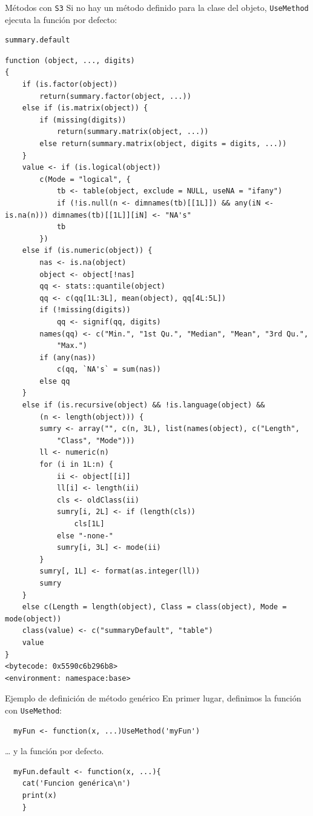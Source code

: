 \documentclass[xcolor={usenames,svgnames,dvipsnames}]{beamer}
\begin{document}
\begin{frame}[label={sec:org9fb195a},fragile]{Métodos con \texttt{S3}}
 Si no hay un método definido para la clase del objeto, \texttt{UseMethod} ejecuta la función por defecto:
\lstset{language=r,label= ,caption= ,captionpos=b,numbers=none}
\begin{lstlisting}
summary.default
\end{lstlisting}

\begin{verbatim}
function (object, ..., digits) 
{
    if (is.factor(object)) 
        return(summary.factor(object, ...))
    else if (is.matrix(object)) {
        if (missing(digits)) 
            return(summary.matrix(object, ...))
        else return(summary.matrix(object, digits = digits, ...))
    }
    value <- if (is.logical(object)) 
        c(Mode = "logical", {
            tb <- table(object, exclude = NULL, useNA = "ifany")
            if (!is.null(n <- dimnames(tb)[[1L]]) && any(iN <- is.na(n))) dimnames(tb)[[1L]][iN] <- "NA's"
            tb
        })
    else if (is.numeric(object)) {
        nas <- is.na(object)
        object <- object[!nas]
        qq <- stats::quantile(object)
        qq <- c(qq[1L:3L], mean(object), qq[4L:5L])
        if (!missing(digits)) 
            qq <- signif(qq, digits)
        names(qq) <- c("Min.", "1st Qu.", "Median", "Mean", "3rd Qu.", 
            "Max.")
        if (any(nas)) 
            c(qq, `NA's` = sum(nas))
        else qq
    }
    else if (is.recursive(object) && !is.language(object) && 
        (n <- length(object))) {
        sumry <- array("", c(n, 3L), list(names(object), c("Length", 
            "Class", "Mode")))
        ll <- numeric(n)
        for (i in 1L:n) {
            ii <- object[[i]]
            ll[i] <- length(ii)
            cls <- oldClass(ii)
            sumry[i, 2L] <- if (length(cls)) 
                cls[1L]
            else "-none-"
            sumry[i, 3L] <- mode(ii)
        }
        sumry[, 1L] <- format(as.integer(ll))
        sumry
    }
    else c(Length = length(object), Class = class(object), Mode = mode(object))
    class(value) <- c("summaryDefault", "table")
    value
}
<bytecode: 0x5590c6b296b8>
<environment: namespace:base>
\end{verbatim}
\end{frame}

\begin{frame}[label={sec:orge9a80bb},fragile]{Ejemplo de definición de método genérico}
 En primer lugar, definimos la función con \texttt{UseMethod}:
\lstset{language=r,label= ,caption= ,captionpos=b,numbers=none}
\begin{lstlisting}
  myFun <- function(x, ...)UseMethod('myFun')
\end{lstlisting}

\ldots{} y la función por defecto.
\lstset{language=r,label= ,caption= ,captionpos=b,numbers=none}
\begin{lstlisting}
  myFun.default <- function(x, ...){
    cat('Funcion genérica\n')
    print(x)
    }
\end{lstlisting}
\end{frame}
\end{document}
